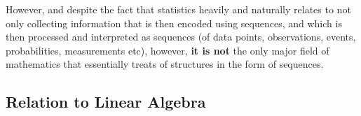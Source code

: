 \documentclass[a4paper, 18pt]{book} %
\begin{document}
\begin{appendices}
\vspace{2em}

However, and despite the fact that statistics heavily and naturally relates to not only collecting information that is then encoded using sequences, and which is then processed and interpreted as sequences (of data points, observations, events, probabilities, measurements etc), however, \textbf{it is not} the only major field of mathematics that essentially treats of structures in the form of sequences. 

\vspace{2em}

\subsection{Relation to Linear Algebra}
\label{SECRELLINALG}


\end{appendices}
\end{document}
